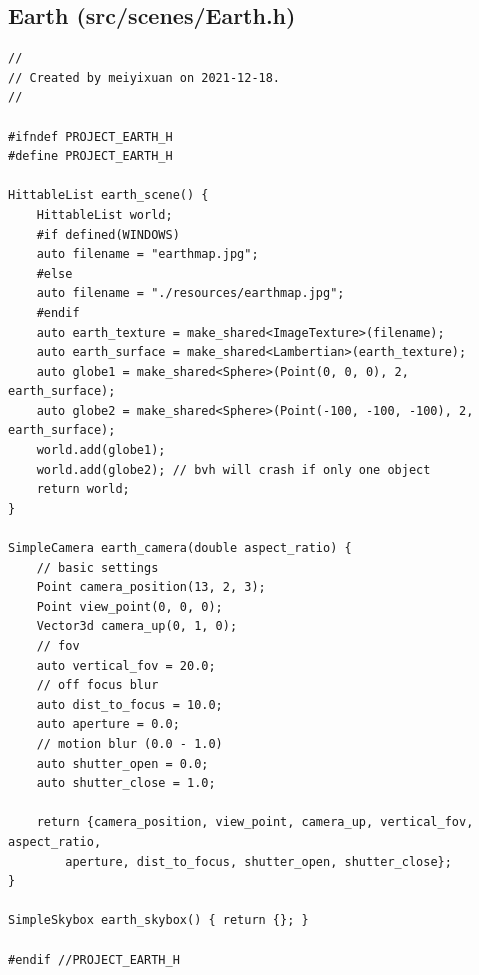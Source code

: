 \documentclass[utf8]{article}
\begin{document}
\subsection{Earth (src/scenes/Earth.h)}
\begin{lstlisting}[style=CStyle]
//
// Created by meiyixuan on 2021-12-18.
//

#ifndef PROJECT_EARTH_H
#define PROJECT_EARTH_H

HittableList earth_scene() {
	HittableList world;
	#if defined(WINDOWS)
	auto filename = "earthmap.jpg";
	#else
	auto filename = "./resources/earthmap.jpg";
	#endif
	auto earth_texture = make_shared<ImageTexture>(filename);
	auto earth_surface = make_shared<Lambertian>(earth_texture);
	auto globe1 = make_shared<Sphere>(Point(0, 0, 0), 2, earth_surface);
	auto globe2 = make_shared<Sphere>(Point(-100, -100, -100), 2, earth_surface);
	world.add(globe1);
	world.add(globe2); // bvh will crash if only one object
	return world;
}

SimpleCamera earth_camera(double aspect_ratio) {
	// basic settings
	Point camera_position(13, 2, 3);
	Point view_point(0, 0, 0);
	Vector3d camera_up(0, 1, 0);
	// fov
	auto vertical_fov = 20.0;
	// off focus blur
	auto dist_to_focus = 10.0;
	auto aperture = 0.0;
	// motion blur (0.0 - 1.0)
	auto shutter_open = 0.0;
	auto shutter_close = 1.0;
	
	return {camera_position, view_point, camera_up, vertical_fov, aspect_ratio,
		aperture, dist_to_focus, shutter_open, shutter_close};
}

SimpleSkybox earth_skybox() { return {}; }

#endif //PROJECT_EARTH_H

\end{lstlisting}
\end{document}
